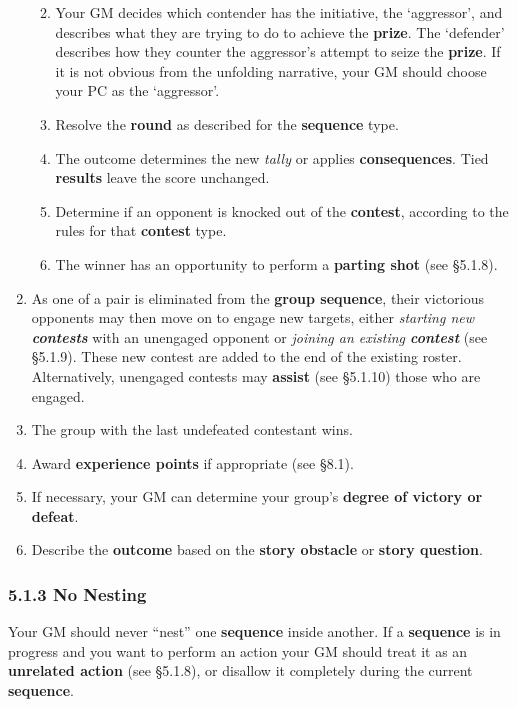 \documentclass[
  11pt,
]{article}
\providecommand{\tightlist}{%
  \setlength{\itemsep}{0pt}\setlength{\parskip}{0pt}}
\begin{document}
\begin{enumerate}
  \begin{enumerate}
  \def\labelenumii{\arabic{enumii}.}
  \tightlist
  \item
    Your GM decides which contender has the initiative, the `aggressor',
    and describes what they are trying to do to achieve the
    \textbf{prize}. The `defender' describes how they counter the
    aggressor's attempt to seize the \textbf{prize}. If it is not
    obvious from the unfolding narrative, your GM should choose your PC
    as the `aggressor'.
  \item
    Resolve the \textbf{round} as described for the \textbf{sequence}
    type.
  \item
    The outcome determines the new \emph{tally} or applies
    \textbf{consequences}. Tied \textbf{results} leave the score
    unchanged.
  \item
    Determine if an opponent is knocked out of the \textbf{contest},
    according to the rules for that \textbf{contest} type.
  \item
    The winner has an opportunity to perform a \textbf{parting shot}
    (see §5.1.8).
  \end{enumerate}
\item
  As one of a pair is eliminated from the \textbf{group sequence}, their
  victorious opponents may then move on to engage new targets, either
  \emph{starting new \textbf{contests}} with an unengaged opponent or
  \emph{joining an existing \textbf{contest}} (see §5.1.9). These new
  contest are added to the end of the existing roster. Alternatively,
  unengaged contests may \textbf{assist} (see §5.1.10) those who are
  engaged.
\item
  The group with the last undefeated contestant wins.
\item
  Award \textbf{experience points} if appropriate (see §8.1).
\item
  If necessary, your GM can determine your group's \textbf{degree of
  victory or defeat}.
\item
  Describe the \textbf{outcome} based on the \textbf{story obstacle} or
  \textbf{story question}.
\end{enumerate}

\hypertarget{no-nesting}{%
\subsubsection{5.1.3 No Nesting}\label{no-nesting}}

Your GM should never ``nest'' one \textbf{sequence} inside another. If a
\textbf{sequence} is in progress and you want to perform an action your
GM should treat it as an \textbf{unrelated action} (see §5.1.8), or
disallow it completely during the current \textbf{sequence}.
\end{document}
